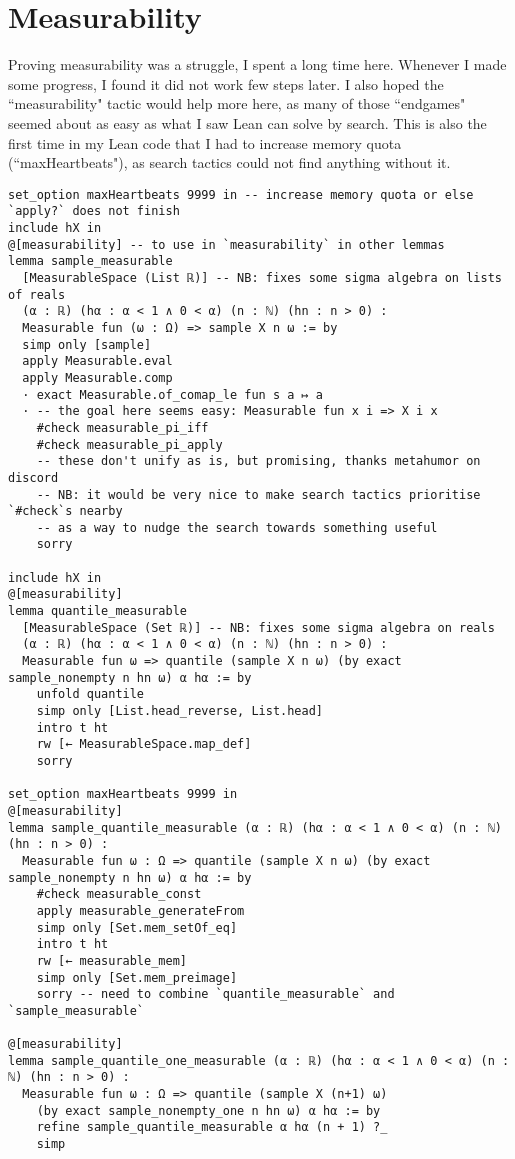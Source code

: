 \documentclass[a4paper, 12pt]{article}
\begin{document}
\section*{Measurability}

Proving measurability was a struggle, I spent a long time here.
Whenever I made some progress, I found it did not work few steps later.
I also hoped the ``measurability" tactic would help more here,
as many of those ``endgames" seemed about as easy as what I saw Lean can solve by search.
This is also the first time in my Lean code that I had to increase memory quota (``maxHeartbeats"),
as search tactics could not find anything without it.

\begin{lstlisting}
set_option maxHeartbeats 9999 in -- increase memory quota or else `apply?` does not finish
include hX in
@[measurability] -- to use in `measurability` in other lemmas
lemma sample_measurable
  [MeasurableSpace (List ℝ)] -- NB: fixes some sigma algebra on lists of reals
  (α : ℝ) (hα : α < 1 ∧ 0 < α) (n : ℕ) (hn : n > 0) :
  Measurable fun (ω : Ω) => sample X n ω := by
  simp only [sample]
  apply Measurable.eval
  apply Measurable.comp
  · exact Measurable.of_comap_le fun s a ↦ a
  · -- the goal here seems easy: Measurable fun x i => X i x
    #check measurable_pi_iff
    #check measurable_pi_apply
    -- these don't unify as is, but promising, thanks metahumor on discord
    -- NB: it would be very nice to make search tactics prioritise `#check`s nearby
    -- as a way to nudge the search towards something useful
    sorry

include hX in
@[measurability]
lemma quantile_measurable
  [MeasurableSpace (Set ℝ)] -- NB: fixes some sigma algebra on reals
  (α : ℝ) (hα : α < 1 ∧ 0 < α) (n : ℕ) (hn : n > 0) :
  Measurable fun ω => quantile (sample X n ω) (by exact sample_nonempty n hn ω) α hα := by
    unfold quantile
    simp only [List.head_reverse, List.head]
    intro t ht
    rw [← MeasurableSpace.map_def]
    sorry

set_option maxHeartbeats 9999 in
@[measurability]
lemma sample_quantile_measurable (α : ℝ) (hα : α < 1 ∧ 0 < α) (n : ℕ) (hn : n > 0) :
  Measurable fun ω : Ω => quantile (sample X n ω) (by exact sample_nonempty n hn ω) α hα := by
    #check measurable_const
    apply measurable_generateFrom
    simp only [Set.mem_setOf_eq]
    intro t ht
    rw [← measurable_mem]
    simp only [Set.mem_preimage]
    sorry -- need to combine `quantile_measurable` and `sample_measurable`

@[measurability]
lemma sample_quantile_one_measurable (α : ℝ) (hα : α < 1 ∧ 0 < α) (n : ℕ) (hn : n > 0) :
  Measurable fun ω : Ω => quantile (sample X (n+1) ω)
    (by exact sample_nonempty_one n hn ω) α hα := by
    refine sample_quantile_measurable α hα (n + 1) ?_
    simp
\end{lstlisting}
\end{document}
